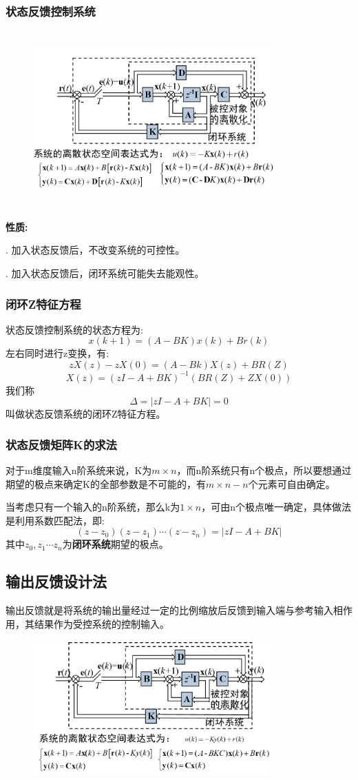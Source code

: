 \documentclass[12pt, a4paper, oneside]{ctexbook}
\begin{document}
\subsubsection{状态反馈控制系统}
\begin{figure}[htbp]
	\centering
	\includegraphics[width=9.3cm,height=6.8cm]{img/8_2.png}
\end{figure}
\noindent \textbf{性质:}

. 加入状态反馈后，不改变系统的可控性。

. 加入状态反馈后，闭环系统可能失去能观性。

\subsubsection{闭环Z特征方程}
\noindent 状态反馈控制系统的状态方程为:
$$
x(k+1)=(A-BK)x(k)+Br(k)
$$
左右同时进行z变换，有:
$$
zX(z)-zX(0)=(A-Bk)X(z)+BR(Z)
$$
$$
X(z)=(zI-A+BK)^{-1}(BR(Z)+ZX(0))
$$
我们称
$$
\Delta=|zI-A+BK|=0
$$
叫做状态反馈系统的闭环Z特征方程。
\subsubsection{状态反馈矩阵K的求法}
对于m维度输入n阶系统来说，K为$m\times n$，而n阶系统只有n个极点，所以要想通过期望的极点来确定K的全部参数是不可能的，有$m\times n-n$个元素可自由确定。

当考虑只有一个输入的n阶系统，那么k为$1\times n$，可由n个极点唯一确定，具体做法是利用系数匹配法，即:
$$
(z-z_0)(z-z_1)\cdots(z-z_n)=|zI-A+BK|
$$
其中$z_0,z_1\cdots z_n$为\textbf{闭环系统}期望的极点。
\subsection{输出反馈设计法}
输出反馈就是将系统的输出量经过一定的比例缩放后反馈到输入端与参考输入相作用，其结果作为受控系统的控制输入。
\begin{figure}[htbp]
	\centering
	\includegraphics[width=9.25cm,height=5.16cm]{img/8_3.png}
\end{figure}
\end{document}
